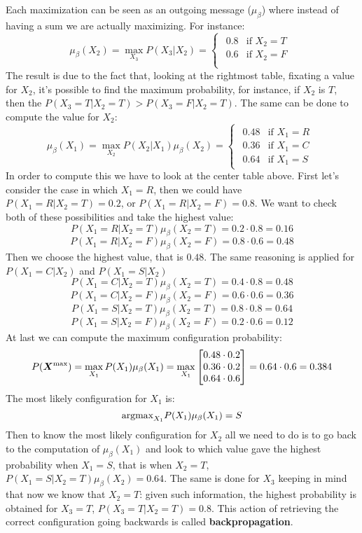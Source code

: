 Each maximization can be seen as an outgoing message ($\mu_\beta$) where instead of having a sum we are actually maximizing. For instance:
\[\mu_\beta(X_2)=\max\limits_{X_3}P(X_3\vert X_2)=
  \begin{cases}
    \begin{array}{ll}
      0.8&\text{if }X_2=T\\
      0.6&\text{if }X_2=F\\
    \end{array}
  \end{cases}
\]
The result is due to the fact that, looking at the rightmost table, fixating a value for $X_2$, it's possible to find the maximum probability, for instance, if $X_2$ is $T$, then the $P(X_3=T\vert X_2=T)>P(X_3=F\vert X_2=T)$. \newline
The same can be done to compute the value for $X_2$:
\[\mu_\beta(X_1)=\max\limits_{X_2}P(X_2\vert X_1)\mu_\beta(X_2)=
\begin{cases}
  \begin{array}{ll}
    0.48&\text{if }X_1=R\\
    0.36&\text{if }X_1=C\\
    0.64&\text{if }X_1=S
  \end{array}
\end{cases}
\]
In order to compute this we have to look at the center table above. First let's consider the case in which $X_1=R$, then we could have $P(X_1=R\vert X_2=T)=0.2$, or $P(X_1=R\vert X_2=F)=0.8$. We want to check both of these possibilities and take the highest value:
\[P(X_1=R\vert X_2=T)\mu_\beta(X_2=T)=0.2\cdot 0.8=0.16\]
\[P(X_1=R\vert X_2=F)\mu_\beta(X_2=F)=0.8\cdot 0.6=0.48\]
Then we choose the highest value, that is $0.48$. The same reasoning is applied for $P(X_1=C\vert X_2)$ and $P(X_1=S\vert X_2)$
\[P(X_1=C\vert X_2=T)\mu_\beta(X_2=T)=0.4\cdot 0.8=0.48\]
\[P(X_1=C\vert X_2=F)\mu_\beta(X_2=F)=0.6\cdot 0.6=0.36\]
\[P(X_1=S\vert X_2=T)\mu_\beta(X_2=T)=0.8\cdot 0.8=0.64\]
\[P(X_1=S\vert X_2=F)\mu_\beta(X_2=F)=0.2\cdot 0.6=0.12\]
At last we can compute the maximum configuration probability:
\[P(\bm{X}^{\text{max}})=\max\limits_{X_1}P(X_1)\mu_\beta(X_1)=\max\limits_{X_1}
  \begin{bmatrix}
    0.48\cdot 0.2\\
    0.36\cdot 0.2\\
    0.64\cdot 0.6
  \end{bmatrix}
  =0.64\cdot 0.6=0.384
\]
The most likely configuration for $X_1$ is:
\[\text{argmax}_{X_1}P(X_1)\mu_\beta(X_1)=S\]
Then to know the most likely configuration for $X_2$ all we need to do is to go back to the computation of $\mu_\beta(X_1)$ and look to which value gave the highest probability when $X_1=S$, that is when $X_2=T$, $P(X_1=S\vert X_2=T)\mu_\beta(X_2)=0.64$. \newline
The same is done for $X_3$ keeping in mind that now we know that $X_2=T$: given such information, the highest probability is obtained for $X_3=T$, $P(X_3=T\vert X_2=T)=0.8$. \newline
This action of retrieving the correct configuration going backwards is called \textbf{backpropagation}. 
%
